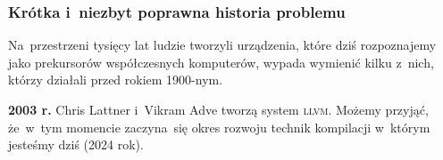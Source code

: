 \documentclass[10pt,t]{beamer}
\begin{document}
\begin{frame}
  \frametitle{Krótka i~niezbyt poprawna historia problemu}


  Na~przestrzeni tysięcy lat ludzie tworzyli urządzenia, które dziś
  rozpoznajemy jako prekursorów współczesnych komputerów, wypada wymienić
  kilku z~nich, którzy działali przed rokiem 1900-nym.

  \textbf{2003 r.} Chris Lattner i~Vikram Adve tworzą system \textsc{llvm}.
  Możemy przyjąć, że~w~tym momencie zaczyna~się okres rozwoju technik
  kompilacji w~którym jesteśmy dziś (2024 rok).

\end{frame}











































\end{document}
